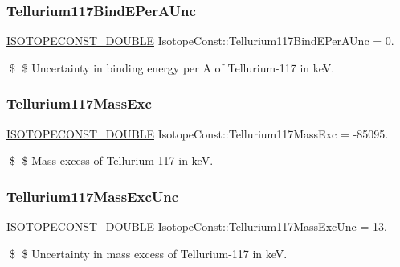 \subsubsection{\texorpdfstring{Tellurium117\+Bind\+E\+Per\+A\+Unc}{Tellurium117BindEPerAUnc}}
{\footnotesize\ttfamily \mbox{\hyperlink{group___isotope_const-_macros_ga8f45a7272ce02c0b4c65c44636ed719a}{I\+S\+O\+T\+O\+P\+E\+C\+O\+N\+S\+T\+\_\+\+D\+O\+U\+B\+LE}} Isotope\+Const\+::\+Tellurium117\+Bind\+E\+Per\+A\+Unc = 0.}

\$ \$ Uncertainty in binding energy per A of Tellurium-\/117 in keV. \mbox{\label{group___isotope_const-_tellurium-_te117_ga45fd9d8ad1b6f76b0129592f4e880138}} 
\subsubsection{\texorpdfstring{Tellurium117\+Mass\+Exc}{Tellurium117MassExc}}
{\footnotesize\ttfamily \mbox{\hyperlink{group___isotope_const-_macros_ga8f45a7272ce02c0b4c65c44636ed719a}{I\+S\+O\+T\+O\+P\+E\+C\+O\+N\+S\+T\+\_\+\+D\+O\+U\+B\+LE}} Isotope\+Const\+::\+Tellurium117\+Mass\+Exc = -\/85095.}

\$ \$ Mass excess of Tellurium-\/117 in keV. \mbox{\label{group___isotope_const-_tellurium-_te117_ga98e6ebdb33b36e3fe0f9247d0c5cafa0}} 
\subsubsection{\texorpdfstring{Tellurium117\+Mass\+Exc\+Unc}{Tellurium117MassExcUnc}}
{\footnotesize\ttfamily \mbox{\hyperlink{group___isotope_const-_macros_ga8f45a7272ce02c0b4c65c44636ed719a}{I\+S\+O\+T\+O\+P\+E\+C\+O\+N\+S\+T\+\_\+\+D\+O\+U\+B\+LE}} Isotope\+Const\+::\+Tellurium117\+Mass\+Exc\+Unc = 13.}

\$ \$ Uncertainty in mass excess of Tellurium-\/117 in keV. \mbox{\label{group___isotope_const-_tellurium-_te117_ga3783ef1cf7ea872ebb752caca733847f}} 
